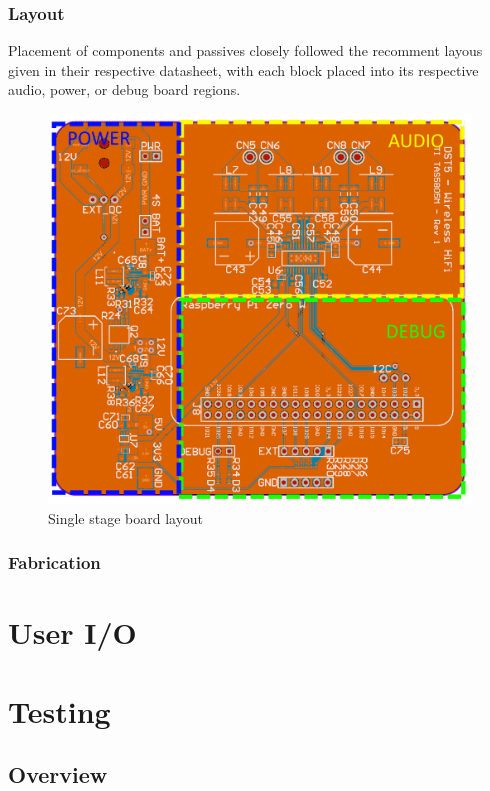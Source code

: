 \documentclass[main.tex]{subfiles}
\begin{document}
\subsubsection{Layout}

Placement of components and passives closely followed the recomment layous given in their respective datasheet, with each block placed into its respective audio, power, or debug board regions. 

\begin{figure}[H]
    \centering
    \includegraphics[scale=0.4]{./figs/ti-pcb.png}
    \caption{Single stage board layout}
    \label{fig:ti-pcb}
\end{figure}

\subsubsection{Fabrication}



\section{User I/O}
\section{Testing}
\subsection{Overview}
\end{document}
